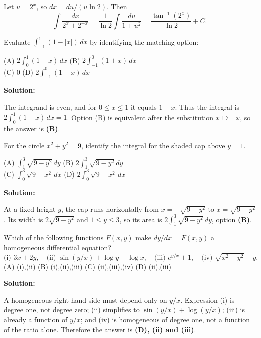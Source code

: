 \documentclass[journal]{IEEEtran}
\begin{document}
\begin{list}{}
Let $u=2^x$, so $dx=du/(u\ln2)$. Then
\[
\int\frac{dx}{2^x+2^{-x}}=\frac1{\ln2}\int\frac{du}{1+u^2}
=\boxed{\frac{\tan^{-1}(2^x)}{\ln2}+C}.
\]

\item[3.1.11] Evaluate $\displaystyle\int_{-1}^{1}(1-|x|)\,dx$ by identifying the matching option:

\noindent (A) $2\int_0^1(1+x)\,dx$ \hfill (B) $2\int_{-1}^0(1+x)\,dx$\\
(C) $0$ \hfill (D) $2\int_{-1}^0(1-x)\,dx$

\vspace{0.6em}\par\noindent\textbf{Solution:}

The integrand is even, and for $0\le x\le1$ it equals $1-x$. Thus the integral is $2\int_0^1(1-x)\,dx=1$. Option (B) is equivalent after the substitution $x\mapsto -x$, so the answer is \textbf{(B)}.

\item[3.1.12] For the circle $x^2+y^2=9$, identify the integral for the shaded cap above $y=1$.

\noindent (A) $\int_1^3\sqrt{9-y^2}\,dy$ \hfill (B) $2\int_1^3\sqrt{9-y^2}\,dy$\\
(C) $\int_0^3\sqrt{9-x^2}\,dx$ \hfill (D) $2\int_0^3\sqrt{9-x^2}\,dx$

\vspace{0.6em}\par\noindent\textbf{Solution:}

At a fixed height $y$, the cap runs horizontally from $x=-\sqrt{9-y^2}$ to $x=\sqrt{9-y^2}$. Its width is $2\sqrt{9-y^2}$ and $1\le y\le3$, so its area is $\boxed{2\int_1^3\sqrt{9-y^2}\,dy}$, option \textbf{(B)}.

\item[3.1.13] Which of the following functions $F(x,y)$ make $dy/dx=F(x,y)$ a homogeneous differential equation?
\[
\text{(i) }3x+2y,\quad \text{(ii) }\sin(y/x)+\log y-\log x,\quad
\text{(iii) }e^{y/x}+1,\quad \text{(iv) }\sqrt{x^2+y^2}-y.
\]
(A) (i),(ii) \quad (B) (i),(ii),(iii) \quad (C) (ii),(iii),(iv) \quad (D) (ii),(iii)

\vspace{0.6em}\par\noindent\textbf{Solution:}

A homogeneous right-hand side must depend only on $y/x$. Expression (i) is degree one, not degree zero; (ii) simplifies to $\sin(y/x)+\log(y/x)$; (iii) is already a function of $y/x$; and (iv) is homogeneous of degree one, not a function of the ratio alone. Therefore the answer is \textbf{(D), (ii) and (iii)}.


\end{list}
\end{document}
